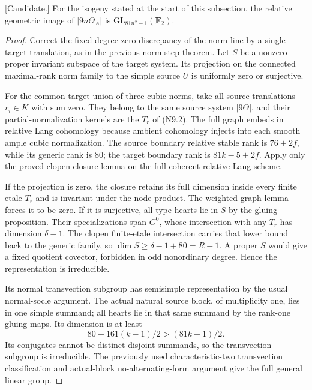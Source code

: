 \begin{theorem}
\label{thm:nine-theta-arbitrary-odd-norm-candidate}
\textup{[Candidate.]}
For the isogeny stated at the start of this subsection, the relative
geometric image of $|9n\Theta_A|$ is
$\mathrm{GL}_{81n^2-1}(\mathbf F_2)$.
\end{theorem}

\begin{proof}
Correct the fixed degree-zero discrepancy of the norm line by a
single target translation, as in the previous norm-step theorem.
Let $S$ be a nonzero proper invariant subspace of the target
system. Its projection on the connected maximal-rank norm family
to the simple source $U$ is uniformly zero or surjective.

For the common target union of three cubic norms, take all source
translations $r_i\in K$ with sum zero. They belong to the same
source system $|9\Theta|$, and their partial-normalization kernels
are the $T_r$ of (N9.2). The full graph embeds in relative Lang
cohomology because ambient cohomology injects into each smooth
ample cubic normalization. The source boundary relative stable
rank is $76+2f$, while its generic rank is $80$; the target
boundary rank is $81k-5+2f$. Apply only the proved clopen closure
lemma on the full coherent relative Lang scheme.

If the projection is zero, the closure retains its full dimension
inside every finite etale $T_r$ and is invariant under the node
product. The weighted graph lemma forces it to be zero. If it is
surjective, all type hearts lie in $S$ by the gluing proposition.
Their specializations span $G^0$, whose intersection with any
$T_r$ has dimension $\delta-1$. The clopen finite-etale
intersection carries that lower bound back to the generic family,
so $\dim S\ge\delta-1+80=R-1$. A proper $S$ would give a fixed
quotient covector, forbidden in odd nonordinary degree. Hence the
representation is irreducible.

Its normal transvection subgroup has semisimple representation
by the usual normal-socle argument. The actual natural source
block, of multiplicity one, lies in one simple summand; all hearts
lie in that same summand by the rank-one gluing maps. Its dimension
is at least
\[
              80+161(k-1)/2>(81k-1)/2.
\]
Its conjugates cannot be distinct disjoint summands, so the
transvection subgroup is irreducible. The previously used
characteristic-two transvection classification and actual-block
no-alternating-form argument give the full general linear group.
\end{proof}

